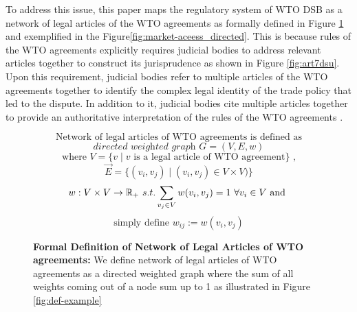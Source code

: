 To address this issue,
this paper maps
the regulatory system of WTO DSB
as a network of legal articles
of the WTO agreements as formally defined in Figure \ref{fig:def} and exemplified in the Figure\ref{fig:market-aceess_directed}. This is because rules of the WTO agreements
explicitly requires judicial bodies to address
relevant articles together to construct its jurisprudence as shown in Figure \ref{fig:art7dsu}.
Upon this requirement, judicial bodies refer to
multiple articles of the WTO agreements together
to identify the complex legal identity of the trade policy that led to the dispute.
In addition to it, judicial bodies cite multiple articles together
to provide an authoritative interpretation of the rules of the WTO agreements
\citep{oesch2003standards}.

\begin{figure}[ht]
    \[\text{Network of legal articles of WTO agreements is defined as}\] %
    \[ \textit{directed weighted graph }G = (V, E, w) \]
    \[\text{ where } V = \{v \mid v\text{ is a legal article of WTO agreement}\}  \text{ , } \]
    \[\vec{E} = \{(v_i, v_j) \mid (v_i, v_j)\in V \times V)\} \] %
    \[w : V \times V \to \Bbb R_{+} \text{ } s.t. \sum_{v_j\in V}{w(v_i, v_j)} = 1 \text{ } \forall v_i \in V \text{ and }\]
    \[\text{simply define } w_{ij} := w(v_i, v_j)\]
    \caption{\textbf{Formal Definition of Network of Legal Articles of WTO agreements: }
        We define network of legal articles of WTO agreements
        as a directed weighted graph where the sum of all weights coming out of a node sum up to 1 as illustrated in Figure \ref{fig:def-example}}
    \label{fig:def}
\end{figure}

